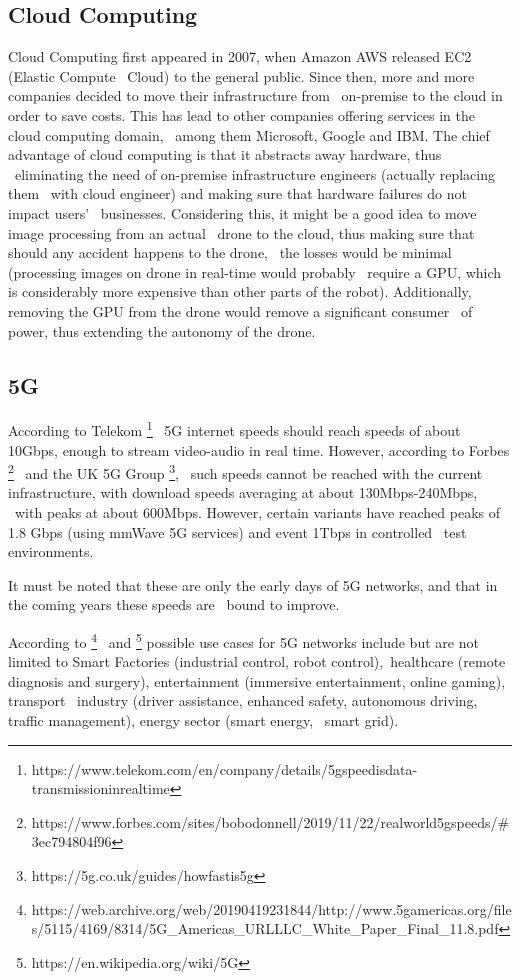 \subsection{Cloud Computing}
\label{subsec:cloud-computing}
Cloud Computing first appeared in 2007, when Amazon AWS released EC2 (Elastic Compute \
Cloud) to the general public.
Since then, more and more companies decided to move their infrastructure from \
on-premise to the cloud in order to save costs.
This has lead to other companies offering services in the cloud computing domain, \
among them Microsoft, Google and IBM.
The chief advantage of cloud computing is that it abstracts away hardware, thus \
eliminating the need of on-premise infrastructure engineers (actually replacing them \
with cloud engineer) and making sure that hardware failures do not impact users' \
businesses.
Considering this, it might be a good idea to move image processing from an actual \
drone to the cloud, thus making sure that should any accident happens to the drone, \
the losses would be minimal (processing images on drone in real-time would probably \
require a GPU, which is considerably more expensive than other parts of the robot).
Additionally, removing the GPU from the drone would remove a significant consumer \
of power, thus extending the autonomy of the drone.

\subsection{5G}
\label{subsec:5g}
According to Telekom \footnote{https://www.telekom.com/en/company/details/5g\-speed\-is\-data-transmission\-in\-real\-time} \
5G internet speeds should reach speeds of about 10Gbps, enough to stream video-audio in real time.
However, according to Forbes \footnote{https://www.forbes.com/sites/bobodonnell/2019/11/22/real\-world\-5g\-speeds/\#3ec794804f96} \
and the UK 5G Group \footnote{https://5g.co.uk/guides/how\-fast\-is\-5g}, \
such speeds cannot be reached with the current infrastructure, with download speeds averaging at about 130Mbps-240Mbps, \
with peaks at about 600Mbps.
However, certain variants have reached peaks of 1.8 Gbps (using mmWave 5G services) and event 1Tbps in controlled \
test environments.

It must be noted that these are only the early days of 5G networks, and that in the coming years these speeds are \
bound to improve.

According to
\footnote{https://web.archive.org/web/20190419231844/http://www.5gamericas.org/files/5115/4169/8314/5G\_Americas\_URLLLC\_White\_Paper\_Final\_11.8.pdf} \
and \footnote{https://en.wikipedia.org/wiki/5G}
possible use cases for 5G networks include but are not limited to  Smart Factories (industrial control, robot control),\
 healthcare (remote diagnosis and surgery), entertainment (immersive entertainment, online gaming), transport \
industry (driver assistance, enhanced safety, autonomous driving, traffic management), energy sector (smart energy, \
smart grid).


